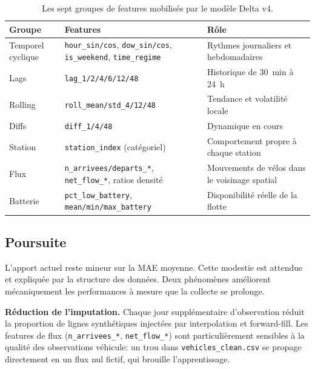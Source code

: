 \documentclass[fleqn, 12pt]{scrartcl}
\begin{document}
\begin{table}[htp]
\centering
\small
\begin{tabular}{p{3.2cm}p{6cm}p{5.2cm}}
\toprule
\textbf{Groupe} & \textbf{Features} & \textbf{Rôle} \\
\midrule
Temporel cyclique & \texttt{hour\_sin/cos}, \texttt{dow\_sin/cos}, \texttt{is\_weekend}, \texttt{time\_regime} & Rythmes journaliers et hebdomadaires \\
\midrule
Lags & \texttt{lag\_1/2/4/6/12/48} & Historique de 30~min à 24~h \\
\midrule
Rolling & \texttt{roll\_mean/std\_4/12/48} & Tendance et volatilité locale \\
\midrule
Diffs & \texttt{diff\_1/4/48} & Dynamique en cours \\
\midrule
Station & \texttt{station\_index} (catégoriel) & Comportement propre à chaque station \\
\midrule
Flux & \texttt{n\_arrivees/departs\_*}, \texttt{net\_flow\_*}, ratios densité & Mouvements de vélos dans le voisinage spatial \\
\midrule
Batterie & \texttt{pct\_low\_battery}, \texttt{mean/min/max\_battery} & Disponibilité réelle de la flotte \\
\bottomrule
\end{tabular}
\caption{Les sept groupes de features mobilisés par le modèle Delta v4.}%
\label{tab:features}
\end{table}

\subsection{Poursuite}%
\label{ssec:poursuite}

L'apport actuel reste mineur sur la MAE moyenne. Cette modestie est attendue et expliquée par la structure des données. Deux phénomènes améliorent mécaniquement les performances à mesure que la collecte se prolonge.

\vspace{0.3cm}

\textbf{Réduction de l'imputation.} Chaque jour supplémentaire d'observation réduit la proportion de lignes synthétiques injectées par interpolation et forward-fill. Les features de flux (\texttt{n\_arrivees\_*}, \texttt{net\_flow\_*}) sont particulièrement sensibles à la qualité des observations véhicule: un trou dans \texttt{vehicles\_clean.csv} se propage directement en un flux nul fictif, qui brouille l'apprentissage.
\end{document}
